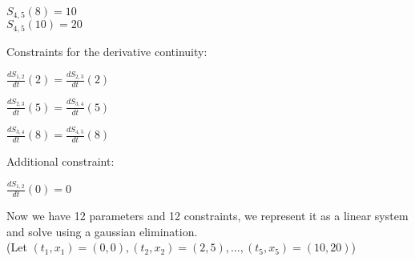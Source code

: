 \documentclass[11pt,letterpaper]{article}
\begin{document}
$S_{4,5}(8) = 10$\\
$S_{4,5}(10) = 20$

Constraints for the derivative continuity:

$\frac{dS_{1,2}}{dt}(2) = \frac{dS_{2,3}}{dt}(2)$

$\frac{dS_{2,3}}{dt}(5) = \frac{dS_{3,4}}{dt}(5)$

$\frac{dS_{3,4}}{dt}(8) = \frac{dS_{4,5}}{dt}(8)$

Additional constraint:

$\frac{dS_{1,2}}{dt}(0) = 0$


Now we have 12 parameters and 12 constraints, we represent it as a linear system and solve using a gaussian elimination.\\
(Let $(t_1, x_1) = (0,0), (t_2, x_2) = (2,5), ... , (t_5,x_5) = (10,20) $)
\end{document}
